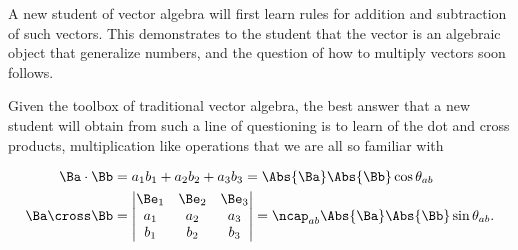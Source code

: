 A new student of vector algebra will first learn 
%
%
%
%
rules for addition and subtraction of such vectors.  
This demonstrates to the student that the vector is an algebraic object that generalize numbers, and the question of how to 
multiply vectors soon follows.

Given the toolbox of traditional vector algebra, the best answer that a new student will obtain from such a line of questioning is to learn of the dot and cross products, multiplication like operations that we are all so familiar with


\begin{dmath}\label{eqn:GAmotivation:60}
\begin{aligned}
\Ba \cdot \Bb &= a_1 b_1 + a_2 b_2 + a_3 b_3 = \Abs{\Ba} \Abs{\Bb} \cos \theta_{ab} \\
\Ba \cross \Bb &= 
\begin{vmatrix}
\Be_1 & \Be_2 & \Be_3 \\
a_1 & a_2 & a_3 \\
b_1 & b_2 & b_3 \\
\end{vmatrix}
= \ncap_{ab} \Abs{\Ba} \Abs{\Bb} \sin\theta_{ab}.
\end{aligned}
\end{dmath}

